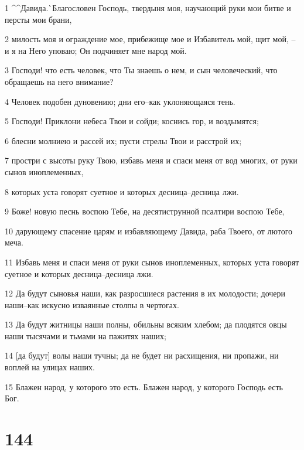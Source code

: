 \par 1 ^^Давида.^^ Благословен Господь, твердыня моя, научающий руки мои битве и персты мои брани,
\par 2 милость моя и ограждение мое, прибежище мое и Избавитель мой, щит мой, --и я на Него уповаю; Он подчиняет мне народ мой.
\par 3 Господи! что есть человек, что Ты знаешь о нем, и сын человеческий, что обращаешь на него внимание?
\par 4 Человек подобен дуновению; дни его--как уклоняющаяся тень.
\par 5 Господи! Приклони небеса Твои и сойди; коснись гор, и воздымятся;
\par 6 блесни молниею и рассей их; пусти стрелы Твои и расстрой их;
\par 7 простри с высоты руку Твою, избавь меня и спаси меня от вод многих, от руки сынов иноплеменных,
\par 8 которых уста говорят суетное и которых десница--десница лжи.
\par 9 Боже! новую песнь воспою Тебе, на десятиструнной псалтири воспою Тебе,
\par 10 дарующему спасение царям и избавляющему Давида, раба Твоего, от лютого меча.
\par 11 Избавь меня и спаси меня от руки сынов иноплеменных, которых уста говорят суетное и которых десница--десница лжи.
\par 12 Да будут сыновья наши, как разросшиеся растения в их молодости; дочери наши--как искусно изваянные столпы в чертогах.
\par 13 Да будут житницы наши полны, обильны всяким хлебом; да плодятся овцы наши тысячами и тьмами на пажитях наших;
\par 14 [да будут] волы наши тучны; да не будет ни расхищения, ни пропажи, ни воплей на улицах наших.
\par 15 Блажен народ, у которого это есть. Блажен народ, у которого Господь есть Бог.

\chapter{144}

